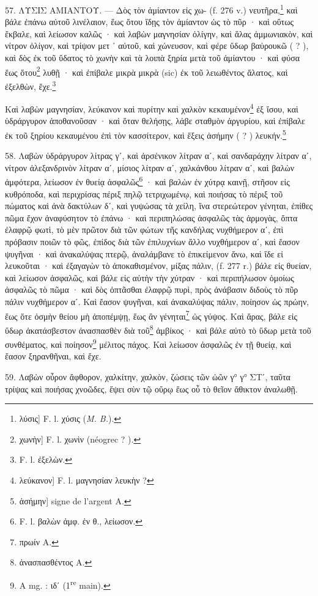 \documentclass[a4paper, 11pt, oneside, polutonikogreek, french]{article}
\begin{document}
57. ΛΥΣΙΣ ΑΜΙΑΝΤΟΥ. --- Δὸς τὸν ἀμίαντον εἰς χω- (f. 276 v.) νευτῆρα,\footnote{λύσις] F. l. χύσις (\emph{M. B.}).} καὶ βάλε ἐπάνω αὐτοῦ λινέλαιον, ἕως ὅτου ἴδῃς τὸν ἀμίαντον ὡς τὸ πῦρ · καὶ οὕτως ἔκβαλε, καὶ λείωσον καλῶς · καὶ λαβὼν μαγνησίαν ὀλίγην, καὶ ἅλας ἀμμωνιακὸν, καὶ νίτρον ὀλίγον, καὶ τρίψον μετ ᾽ αὐτοῦ, καὶ χώνευσον, καὶ φέρε ὕδωρ βαὐρουκῶ ( ? ), καὶ δὸς ἐκ τοῦ ὕδατος τὸ χωνὴν καὶ τὰ λοιπὰ ξηρία μετὰ τοῦ ἀμίαντου · καὶ φύσα ἕως ὅτου\footnote{χωνὴν] F. l. χωνὶν (néogrec ? ).} λυθῇ · καὶ ἐπίβαλε μικρὰ μικρὰ (sic) ἐκ τοῦ λειωθέντος ἅλατος, καὶ ἐξελθὼν, ἔχε.\footnote{F. l. ἐξελὼν.}

Καὶ λαβὼν μαγνησίαν, λεύκανον καὶ πυρίτην καὶ χαλκὸν κεκαυμένον\footnote{λεύκανον] F. l. μαγνησίαν λευκὴν ?} ἐξ ἴσου, καὶ ὑδράργυρον ἀποθανοῦσαν · καὶ ὅταν θελήσῃς, λάβε σταθμὸν ἀργυρίου, καὶ ἐπίβαλε ἐκ τοῦ ξηρίου κεκαυμένου ἐπὶ τὸν κασσίτερον, καὶ ἕξεις ἀσήμην ( ? ) λευκήν.\footnote{ἀσήμην] signe de l'argent A.}

58. Λαβὼν ὑδράργυρον λίτρας γʹ, καὶ ἀρσένικον λίτραν αʹ, καὶ σανδαράχην λίτραν αʹ, νίτρον ἀλεξανδρινὸν λίτραν αʹ, μίσιος λίτραν αʹ, χαλκάνθου λίτραν αʹ, καὶ βαλὼν ἀμφότερα, λείωσον ἐν θυείᾳ ἀσφαλῶς\footnote{F. l. βαλὼν ἀμφ. ἐν θ., λείωσον.} · καὶ βαλὼν ἐν χύτρᾳ καινῇ, στῆσον εἰς κυθρόποδα, καὶ περιχρίσας πέριξ πηλῷ τετριχωμένῳ, καὶ ποιήσας τὸ πέριξ τοῦ πώματος καὶ ἀνὰ δακτύλων δʹ, καὶ γυψώσας τὰ χείλη, ἵνα στερεώτερον γένηται, ἐπίθες πῶμα ἔχον ἀναφύσητον τὸ ἐπάνω · καὶ περιπηλώσας ἀσφαλῶς τὰς ἀρμογὰς, ὄπτα ἐλαφρῷ φωτὶ, τὸ μὲν πρῶτον διὰ τῶν φώτων τῆς κανδήλας νυχθήμερον αʹ, ἐπὶ πρόβασιν ποιῶν τὸ φῶς, ἐπίδος διὰ τῶν ἐπιλυχνίων ἄλλο νυχθήμερον αʹ, καὶ ἔασον ψυγῆναι · καὶ ἀνακαλύψας πτερῷ, ἀναλάμβανε τὸ ἐπικείμενον ἄνω, καὶ ἴδε εἰ λευκοῦται · καὶ ἐξαγαγὼν τὸ ἀποκαθισμένον, μίξας πάλιν, (f. 277 r.) βάλε εἰς θυείαν, καὶ λείωσον ἀσφαλῶς, καὶ βάλε εἰς αὐτὴν τὴν χύτραν · καὶ περιπήλωσον ὁμοίως ἀσφαλῶς τὸ πῶμα · καὶ δὸς ὀπτᾶσθαι ἐλαφρῷ πυρὶ, πρὸς ἀνάβασιν διδοὺς τὸ πῦρ πάλιν νυχθήμερον αʹ. Καὶ ἔασον ψυγῆναι, καὶ ἀνακαλύψας πάλιν, ποίησον ὡς πρώην, ἕως ὅτε ὀσμὴν θείου μὴ ἀποπέμψῃ, ἕως ἂν γένηται\footnote{πρωίν A.} ὠς γύψος. Καὶ ἄρας, βάλε εἰς ὕδωρ ἀκατάσβεστον ἀνασπασθὲν διὰ τοῦ\footnote{ἀνασπασθέντος A.} ἀμβίκος · καὶ βάλε αὐτὸ τὸ ὕδωρ μετὰ τοῦ συνθέματος, καὶ ποίησον\footnote{A mg. : ιδʹ (1\textsuperscript{re} main).} μέλιτος πάχος. Καὶ λείωσον ἀσφαλῶς ἐν τῇ θυείᾳ, καὶ ἔασον ξηρανθῆναι, καὶ ἔχε.

59. Λαβὼν οὖρον ἄφθορον, χαλκίτην, χαλκὸν, ζώσεις τῶν ὠῶν γ° γ° ΣΤʹ, ταῦτα τρίψας καὶ ποιήσας χνοῶδες, ἕψει σὺν τῷ οὔρῳ ἕως οὗ τὸ θεῖον ἄθικτον ἀναλωθῇ.
\end{document}
